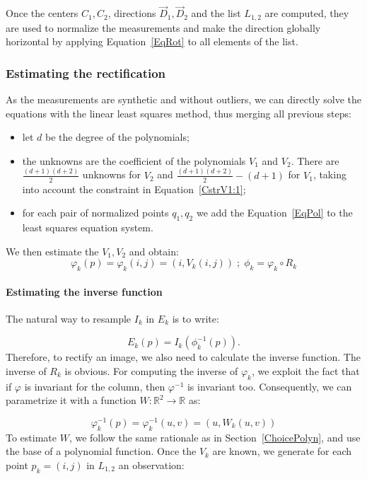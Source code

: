\documentclass{ipol}
\newcommand{\RR}{\ensuremath{\mathbb{R}}}
\begin{document}
Once the centers $C_1,C_2$, directions   $\vec{D}_1,\vec{D}_2$  and the list $L_{1,2}$ are computed,
they are used to normalize the measurements and make the direction globally
horizontal by applying Equation~\eqref{EqRot} to all elements of the list.


\subsubsection{Estimating the rectification}

As the measurements are synthetic and without outliers, we can directly solve
the equations with the linear least squares  method, thus merging all previous steps:

\begin{itemize}
    \item let $d$ be the degree of the polynomials;
    \item the unknowns are the coefficient of the polynomials $V_1$ and $V_2$. There are
          $\frac{(d+1)(d+2)}{2}$ unknowns for $V_2$ and $\frac{(d+1)(d+2)}{2}-(d+1) $  for $V_1$,
          taking into account the  constraint in Equation~\eqref{CstrV1:1};
     \item for each pair of normalized points $q_1,q_2$ we add 
          the Equation~\eqref{EqPol} to the least squares equation system.
\end{itemize}
%
We then estimate the $V_1,V_2$ and obtain:
%
\begin{equation}
  \varphi_k(p) = \varphi_k(i,j) = (i,V_k(i,j))  \;;\;    \phi_k =  \varphi_k  \circ R_k 
\end{equation}

\paragraph{Estimating the inverse function}

The natural way to resample  $I_k$ in $E_k$ is to write:

\begin{equation}
  E_k(p) = I_k(\phi^{-1}_k(p)).
\end{equation}
Therefore, to rectify an image, we also need to calculate the inverse function. The inverse of $R_k$ is obvious. For computing the inverse of $\varphi_k$,  we
exploit the fact that if $\varphi$ is invariant for the column, then $\varphi^{-1}$ is invariant too. Consequently, we can parametrize it with a function $W: \RR^2 \rightarrow \RR$ as:

\begin{equation}
  \varphi^{-1}_k(p) = \varphi^{-1}_k(u,v) = (u,W_k(u,v))  
\end{equation}
%
To estimate  $W$, we follow the same rationale as in Section~\ref{ChoicePolyn}, and
use the base of a polynomial function. Once the $V_k$ are known, we generate
for each point $p_k=(i,j)$ in $L_{1,2}$ an observation:
\end{document}
